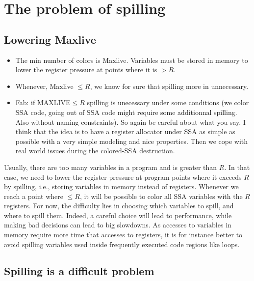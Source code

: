 {\section{The problem of spilling}
\subsection{Lowering Maxlive}

{\sl
\begin{itemize}
  \item The min number of colors is Maxlive. Variables must be stored in memory 
    to lower the register pressure at points where it is $>R$.
  \item Whenever, Maxlive $\leq R$, we know for sure that spilling more in 
    unnecessary.
  \item Fab: if MAXLIVE$\leq R$ spilling is unecessary under some conditions (we color SSA code, going out of SSA code might require some additionnal spilling. Also without naming constraints). So again be careful about what you say. I think that the idea is to have a register allocator under SSA as simple as possible with a very simple modeling and nice properties. Then we cope with real world issues during the colored-SSA destruction.
\end{itemize}
}

Usually, there are too many variables in a program and \maxlive is greater than 
$R$. In that case, we need to lower the register pressure at program points 
where it exceeds $R$ by spilling, i.e., storing variables in memory instead of 
registers. Whenever we reach a point where \maxlive $\leq R$, it will be 
possible to color all SSA variables with the $R$ registers. For now, the 
difficulty lies in choosing which variables to spill, and where to spill them. 
Indeed, a careful choice will lead to performance, while making bad decisions 
can lead to big slowdowns. As accesses to variables in memory require more time 
that accesses to registers, it is for instance better to avoid spilling 
variables used inside frequently executed code regions like loops.



\subsection{Spilling is a difficult problem}

}
